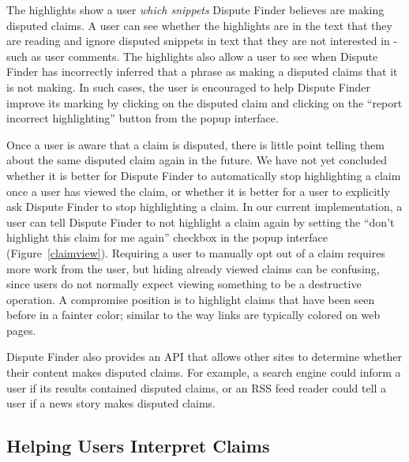 \documentclass{www2010-accepted}
\newcommand{\todo}[1]{}
\begin{document}
The highlights show a user {\it which snippets} Dispute Finder believes are making disputed claims. A user can see whether the highlights are in the text that they are reading and ignore disputed snippets in text that they are not interested in - such as user comments. The highlights also allow a user to see when Dispute Finder has incorrectly inferred that a phrase as making a disputed claims that it is not making. In such cases, the user is encouraged to help Dispute Finder improve its marking by clicking on the disputed claim and clicking on the ``report incorrect highlighting'' button from the popup interface.

Once a user is aware that a claim is disputed, there is little point telling them about the same disputed claim again in the future. We have not yet concluded whether it is better for Dispute Finder to automatically stop highlighting a claim once a user has viewed the claim, or whether it is better for a user to explicitly ask Dispute Finder to stop highlighting a claim. In our current implementation, a user can tell Dispute Finder to not highlight a claim again by setting the ``don't highlight this claim for me again'' checkbox in the popup interface (Figure~\ref{claimview}). Requiring a user to manually opt out of a claim requires more work from the user, but hiding already viewed claims can be confusing, since users do not normally expect viewing something to be a destructive operation. A compromise position is to highlight claims that have been seen before in a fainter color; similar to the way links are typically colored on web pages.

\todo{Try using a fainter color}

\todo{Text is wrong in the screenshot}

Dispute Finder also provides an API that allows other sites to determine whether their content makes disputed claims. For example, a search engine could inform a user if its results contained disputed claims, or an RSS feed reader could tell a user if a news story makes disputed claims.

\todo{Document API online}
\todo{Change the highlight color to yellow? Auto-adjust highlight color based on background color?}
\todo{Should we automatically adjust the highlight color, based on the background color of the page}
\todo{Discuss previous work on highlighting here, rather than in related work?}



\subsection{Helping Users Interpret Claims}
\end{document}
